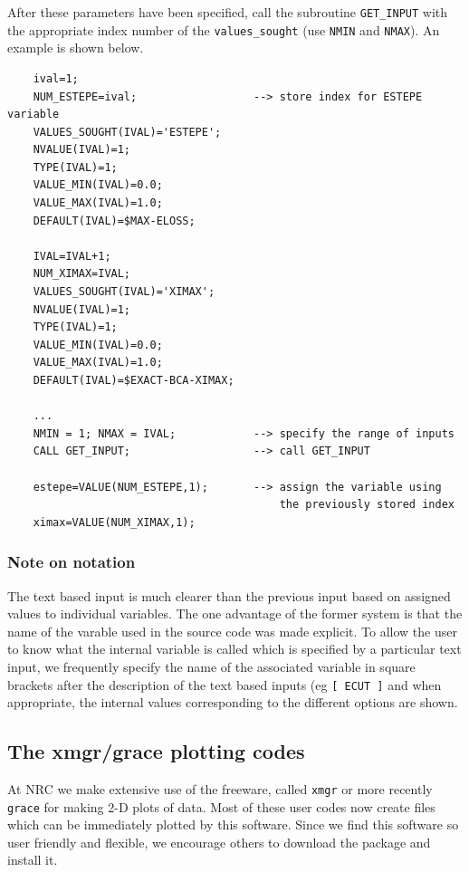 \documentclass[12pt,twoside]{article}  %
\begin{document}
After these parameters have been specified, call the subroutine 
\verb+GET_INPUT+ with the appropriate index number of the 
\verb+values_sought+ (use \verb+NMIN+ and \verb+NMAX+).
An example is shown below.
\begin{verbatim}
    ival=1;
    NUM_ESTEPE=ival;                  --> store index for ESTEPE variable
    VALUES_SOUGHT(IVAL)='ESTEPE';
    NVALUE(IVAL)=1;
    TYPE(IVAL)=1;
    VALUE_MIN(IVAL)=0.0;
    VALUE_MAX(IVAL)=1.0;
    DEFAULT(IVAL)=$MAX-ELOSS;

    IVAL=IVAL+1;
    NUM_XIMAX=IVAL;
    VALUES_SOUGHT(IVAL)='XIMAX';
    NVALUE(IVAL)=1;
    TYPE(IVAL)=1;
    VALUE_MIN(IVAL)=0.0;
    VALUE_MAX(IVAL)=1.0;
    DEFAULT(IVAL)=$EXACT-BCA-XIMAX;

    ...
    NMIN = 1; NMAX = IVAL;            --> specify the range of inputs
    CALL GET_INPUT;                   --> call GET_INPUT

    estepe=VALUE(NUM_ESTEPE,1);       --> assign the variable using 
                                          the previously stored index
    ximax=VALUE(NUM_XIMAX,1);
\end{verbatim}

\subsubsection{Note on notation}
The text based input is much clearer than the previous input based on
assigned values to individual variables. The one advantage of the former
system is that the name of the varable used in the source code was made
explicit.  To allow the user to know what the internal variable is called
which is specified by a particular text input, we frequently specify the
name of the associated variable in square brackets after the description of
the text based inputs (eg {\tt [ ECUT ]} and when appropriate, the
internal values corresponding to the different options are shown. 

\subsection{The xmgr/grace plotting codes}

At NRC we make extensive use of the freeware, called {\tt xmgr} or more
recently {\tt grace} for making 2-D plots of data.  Most of these user
codes now create files which can be immediately plotted by this software.
Since we find this software so user friendly and flexible, we encourage
others to download the package and install it.  
\end{document}
